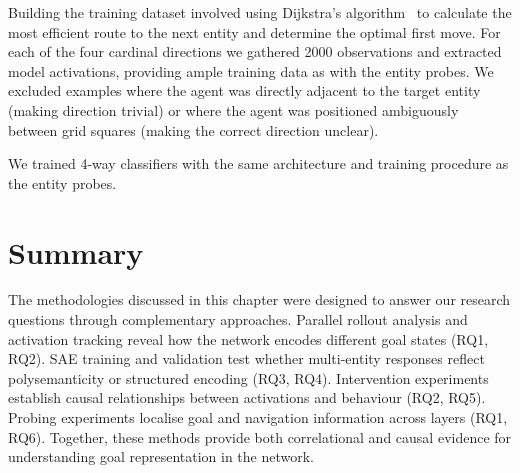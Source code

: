 Building the training dataset involved using Dijkstra's algorithm~\citep{dijkstra1959note} to calculate the most efficient route to the next entity and determine the optimal first move. For each of the four cardinal directions we gathered 2000 observations and extracted model activations, providing ample training data as with the entity probes. We excluded examples where the agent was directly adjacent to the target entity (making direction trivial) or where the agent was positioned ambiguously between grid squares (making the correct direction unclear).

We trained 4-way classifiers with the same architecture and training procedure as the entity probes.

\section{Summary}
\label{sec:method_summary_revised}
The methodologies discussed in this chapter were designed to answer our research questions through complementary approaches. Parallel rollout analysis and activation tracking reveal how the network encodes different goal states (RQ1, RQ2). SAE training and validation test whether multi-entity responses reflect polysemanticity or structured encoding (RQ3, RQ4). Intervention experiments establish causal relationships between activations and behaviour (RQ2, RQ5). Probing experiments localise goal and navigation information across layers (RQ1, RQ6). Together, these methods provide both correlational and causal evidence for understanding goal representation in the network.

